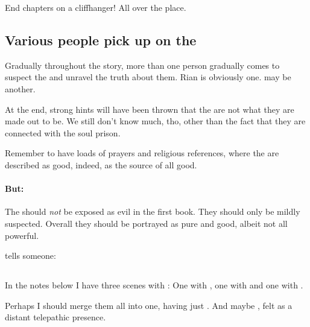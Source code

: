 End chapters on a cliffhanger! 
All over the place.









\subsection{Various people pick up on the \Sephiroth}
Gradually throughout the story, more than one person gradually comes to suspect the \Sephiroth{} and unravel the truth about them. 
Rian is obviously one. 
\Tiroco{} may be another. 

At the end, strong hints will have been thrown that the \Sephiroth{} are not what they are made out to be. We still don't know much, tho, other than the fact that they are connected with the soul prison. 

Remember to have loads of prayers and religious references, where the \Sephiroth{} are described as good, indeed, as the source of all good. 


\paragraph{But:} 
The \sephiroth should \emph{not} be exposed as evil in the first book. 
They should only be mildly suspected.
Overall they should be portrayed as pure and good, albeit not all powerful. 

\Psyrex tells someone: 









\subsection[Locar Psyrex]{\LocarPsyrex}
In the notes below I have three scenes with \Psyrex: 
One with \Vizsherioch, one with \Nzessuacrith and one with \Ishnaruchaefir. 

Perhaps I should merge them all into one, having just \Nzessuacrith.
And maybe \Vizsherioch, felt as a distant telepathic presence. 





